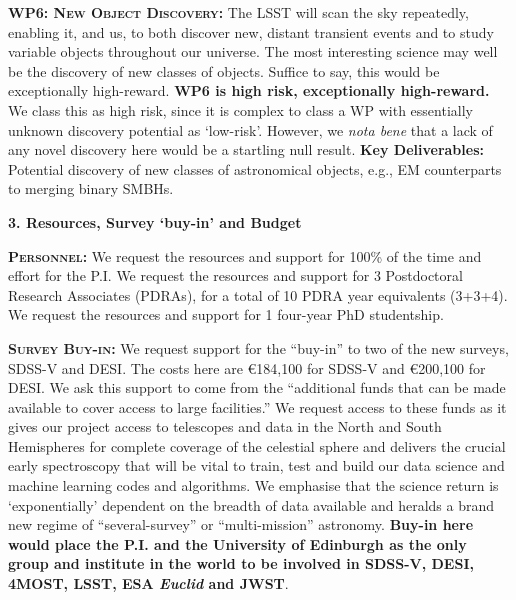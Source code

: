 \documentclass[oneside, a4paper, onecolumn, 11pt]{article}
\begin{document}
\smallskip
\smallskip
\noindent
\textbf{\textsc{WP6: New Object Discovery:}} 
The LSST will scan the sky repeatedly, enabling it, and us, to both
discover new, distant transient events and to study variable objects
throughout our universe. The most interesting science may well be the
discovery of new classes of objects. Suffice to say, this would be
exceptionally high-reward.  {\bf WP6 is high risk, exceptionally
high-reward.}  We class this as high risk, since it is complex to
class a WP with essentially unknown discovery potential as `low-risk'.
However, we {\it nota bene} that a lack of any novel discovery here
would be a startling null result.  {\bf Key Deliverables:} Potential
discovery of new classes of astronomical objects, e.g., EM
counterparts to merging binary SMBHs.


\smallskip \smallskip
\smallskip \smallskip
\noindent
\large
{\bf{\textcolor{Cerulean}{3. Resources,  Survey `buy-in' and Budget}}}
\normalsize

\smallskip
\smallskip
\noindent
\textbf{\textsc{Personnel:}} 
We request the resources and support for 100\% of the time and effort
for the P.I. We request the resources and support for 3 Postdoctoral
Research Associates (PDRAs), for a total of 10 PDRA year equivalents
(3+3+4). We request the resources and support for 1 four-year PhD
studentship.


\smallskip
\smallskip
\noindent
\textbf{\textsc{Survey Buy-in:}} 
We request support for the ``buy-in'' to two of the new surveys,
SDSS-V and DESI. The costs here are \euro184,100 for SDSS-V and
\euro200,100 for DESI.  We ask this support to come from the
``additional funds that can be made available to cover access to large
facilities.''  We request access to these funds as it
gives our project access to telescopes and data in the North and
South Hemispheres for complete coverage of the celestial sphere 
and delivers the crucial early spectroscopy that will be vital to
train, test and build our data science and machine learning codes and
algorithms.  We emphasise that the science return is `exponentially'
dependent on the breadth of data available and heralds a brand new regime of ``several-survey'' or
``multi-mission'' astronomy.  {\bf Buy-in here would place the
P.I. and the University of Edinburgh as the only group and institute
in the world to be involved in SDSS-V, DESI, 4MOST, LSST, ESA {\it
Euclid} and JWST}.
\end{document}
